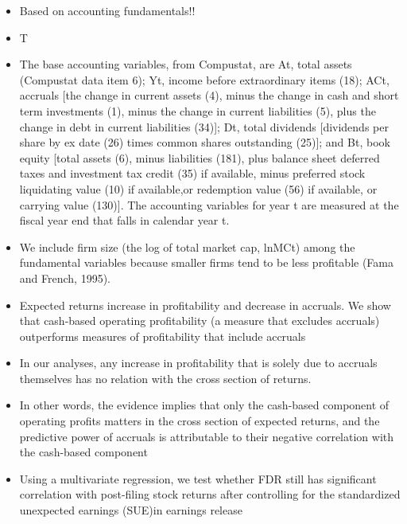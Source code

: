 \documentclass[12pt]{article}
\begin{document}
    \begin{itemize}

        \item Based on accounting fundamentals!! 

        \item T

        \item The base accounting variables, from Compustat, are At, total assets (Compustat data item 6); Yt, income before extraordinary items (18); ACt, accruals [the change in current assets (4), minus the change in cash and short term investments (1), minus the change in current liabilities (5), plus the change in debt in current liabilities (34)]; Dt, total dividends [dividends per share by ex date (26) times common shares outstanding (25)]; and Bt, book equity  [total assets (6), minus liabilities (181), plus balance sheet deferred taxes and investment tax credit (35) if available, minus preferred stock liquidating value (10) if available,or redemption value (56) if available, or carrying value (130)]. The accounting variables for year t are measured at the fiscal year end that falls in calendar year t. \citep{Fama2006}

        \item We include firm size (the log of total market cap, lnMCt) among the fundamental variables because smaller firms tend to be less profitable (Fama and French, 1995).\citep{Fama2006}

        \item Expected returns increase in profitability and decrease in accruals. We show that cash-based operating profitability (a measure that excludes accruals) outperforms measures of profitability that include accruals \citep{Ball2016}

        \item In our analyses, any increase in profitability that is solely due to accruals themselves has no relation with the cross section of returns.\citep{Ball2016}

        \item In other words, the evidence implies that only the cash-based component of operating profits matters in the cross section of expected returns, and the predictive power of accruals is attributable to their negative correlation with the cash-based component \citep{Ball2016}
       
        \item Using a multivariate regression, we test whether FDR still has significant correlation with post-filing stock returns after controlling for the standardized unexpected earnings (SUE)in earnings release \citep{You2009}

    \end{itemize}
\end{document}

